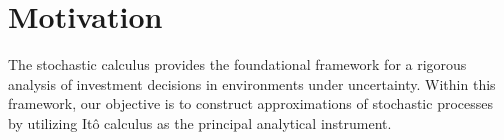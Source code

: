 \section{Motivation}
The stochastic calculus provides the foundational framework for a rigorous analysis of investment decisions in environments under uncertainty. Within this framework, our objective is to construct approximations of stochastic processes by utilizing Itô calculus as the principal analytical instrument.